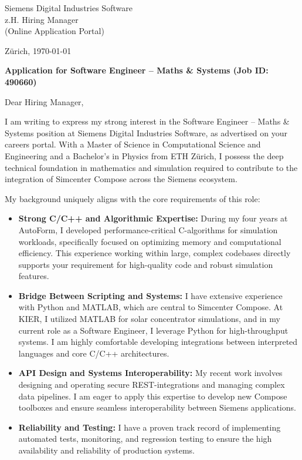 \documentclass[11pt,a4paper]{article}
\begin{document}
Siemens Digital Industries Software\\
z.H. Hiring Manager\\
(Online Application Portal)

\vspace{12pt}

Zürich, \today

\vspace{12pt}

\textbf{Application for Software Engineer -- Maths \& Systems (Job ID: 490660)}

\vspace{12pt}

Dear Hiring Manager,

I am writing to express my strong interest in the Software Engineer -- Maths \& Systems position at Siemens Digital Industries Software, as advertised on your careers portal. With a Master of Science in Computational Science and Engineering and a Bachelor’s in Physics from ETH Zürich, I possess the deep technical foundation in mathematics and simulation required to contribute to the integration of Simcenter Compose across the Siemens ecosystem.

My background uniquely aligns with the core requirements of this role:

\begin{itemize}
  \item \textbf{Strong C/C++ and Algorithmic Expertise:} During my four years at AutoForm, I developed performance-critical C-algorithms for simulation workloads, specifically focused on optimizing memory and computational efficiency. This experience working within large, complex codebases directly supports your requirement for high-quality code and robust simulation features.
  \item \textbf{Bridge Between Scripting and Systems:} I have extensive experience with Python and MATLAB, which are central to Simcenter Compose. At KIER, I utilized MATLAB for solar concentrator simulations, and in my current role as a Software Engineer, I leverage Python for high-throughput systems. I am highly comfortable developing integrations between interpreted languages and core C/C++ architectures.
  \item \textbf{API Design and Systems Interoperability:} My recent work involves designing and operating secure REST-integrations and managing complex data pipelines. I am eager to apply this expertise to develop new Compose toolboxes and ensure seamless interoperability between Siemens applications.
  \item \textbf{Reliability and Testing:} I have a proven track record of implementing automated tests, monitoring, and regression testing to ensure the high availability and reliability of production systems.
\end{itemize}
\end{document}
